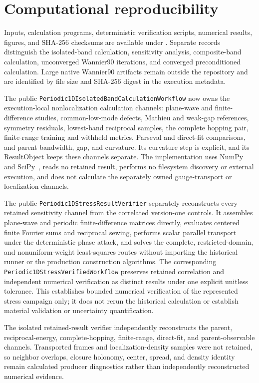 \section{Computational reproducibility}

Inputs, calculation programs, deterministic verification scripts, numerical
results, figures, and SHA-256 checksums are available under
. Separate records distinguish
the isolated-band calculation, sensitivity analysis, composite-band
calculation, unconverged Wannier90 iterations, and converged preconditioned
calculation. Large native Wannier90 artifacts remain outside the repository and
are identified by file size and SHA-256 digest in the execution metadata.

The public
\texttt{Periodic1DIsolatedBandCalculationWorkflow} now owns the execution-local
nonlocalization calculation channels: plane-wave and finite-difference studies,
common-low-mode defects, Mathieu and weak-gap references, symmetry residuals,
lowest-band reciprocal samples, the complete hopping pair, finite-range training and
withheld metrics, Parseval and direct-fit comparisons, and parent bandwidth, gap, and
curvature. Its curvature step is explicit, and its ResultObject keeps these channels
separate. The implementation uses NumPy and SciPy~\cite{harris2020,virtanen2020}, reads
no retained result, performs no filesystem discovery or external execution, and does
not calculate the separately owned gauge-transport or localization channels.

The public \texttt{Periodic1DStressResultVerifier} separately reconstructs every
retained sensitivity channel from the correlated version-one controls. It assembles
plane-wave and periodic finite-difference matrices directly, evaluates centered
finite Fourier sums and reciprocal sewing, performs scalar parallel transport under
the deterministic phase attack, and solves the complete, restricted-domain, and
nonuniform-weight least-squares routes without importing the historical runner or the
production construction algorithms. The corresponding
\texttt{Periodic1DStressVerifiedWorkflow} preserves retained correlation and
independent numerical verification as distinct results under one explicit unitless
tolerance. This establishes bounded numerical verification of the represented stress
campaign only; it does not rerun the historical calculation or establish material
validation or uncertainty quantification.

The isolated retained-result verifier independently reconstructs the parent,
reciprocal-energy, complete-hopping, finite-range, direct-fit, and parent-observable
channels. Transported frames and localization-density samples were not retained, so
neighbor overlaps, closure holonomy, center, spread, and density identity remain
calculated producer diagnostics rather than independently reconstructed numerical
evidence.

